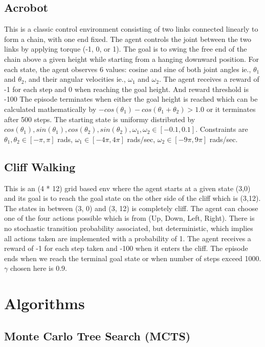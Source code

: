 \documentclass{article}
\begin{document}
\subsection{Acrobot}

This is a classic control environment consisting of two links connected linearly to form a chain, with one end fixed.
The agent controls the joint between the two links by applying torque (-1, 0, or 1).
The goal is to swing the free end of the chain above a given height while starting from a hanging downward position.
For each state, the agent observes 6 values: cosine and sine of both joint angles ie., $\theta_1$ and $\theta_2$, and their angular velocities ie., $\omega_1$ and $\omega_2$.
The agent receives a reward of -1 for each step and 0 when reaching the goal height. And reward threshold is -100
The episode terminates when either the goal height is reached which can be calculated mathematically by $-cos(\theta_1)-cos(\theta_1+\theta_2)>1.0$ or it terminates after 500 steps.
The starting state is uniformy distributed by $cos(\theta_1), sin(\theta_1), cos(\theta_2), sin(\theta_2), \omega_1, \omega_2 \in [-0.1,0.1]$.
Constraints are $\theta_1, \theta_2 \in [-\pi, \pi]$ rads, $\omega_1 \in [-4\pi, 4\pi]$ rads/sec, $\omega_2 \in [-9\pi, 9\pi]$ rads/sec.

\subsection{Cliff Walking}
This is an (4 * 12) grid based env where the agent starts at a given state (3,0) and its goal is to reach the goal state on the other side of the cliff which is (3,12). The states in between (3, 0) and (3, 12) is completely cliff. The agent can choose one of the four actions possible which is from (Up, Down, Left, Right). There is no stochastic transition probability associated, but deterministic, which implies all actions taken are implemented with a probability of 1. The agent receives a reward of -1 for each step taken and -100 when it enters the cliff. The episode ends when we reach the terminal goal state or when number of steps exceed 1000. $\gamma$ chosen here is 0.9. 




\section{Algorithms}

\subsection{Monte Carlo Tree Search (MCTS)}
\end{document}
